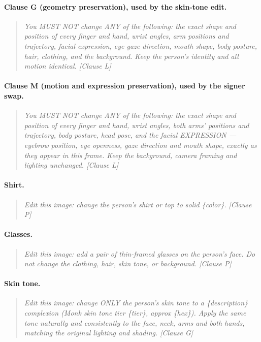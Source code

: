 \paragraph{Clause G (geometry preservation), used by the skin-tone edit.}
\begin{quote}\small\itshape
You MUST NOT change ANY of the following: the exact shape and position of
every finger and hand, wrist angles, arm positions and trajectory, facial
expression, eye gaze direction, mouth shape, body posture, hair, clothing,
and the background. Keep the person's identity and all motion identical.
[Clause L]
\end{quote}

\paragraph{Clause M (motion and expression preservation), used by the signer swap.}
\begin{quote}\small\itshape
You MUST NOT change ANY of the following: the exact shape and position of
every finger and hand, wrist angles, both arms' positions and trajectory,
body posture, head pose, and the facial EXPRESSION --- eyebrow position,
eye openness, gaze direction and mouth shape, exactly as they appear in
this frame. Keep the background, camera framing and lighting unchanged.
[Clause L]
\end{quote}

\paragraph{Shirt.}
\begin{quote}\small\itshape
Edit this image: change the person's shirt or top to solid \{color\}.
[Clause P]
\end{quote}

\paragraph{Glasses.}
\begin{quote}\small\itshape
Edit this image: add a pair of thin-framed glasses on the person's face.
Do not change the clothing, hair, skin tone, or background. [Clause P]
\end{quote}

\paragraph{Skin tone.}
\begin{quote}\small\itshape
Edit this image: change ONLY the person's skin tone to a \{description\}
complexion (Monk skin tone tier \{tier\}, approx \{hex\}). Apply the same
tone naturally and consistently to the face, neck, arms and both hands,
matching the original lighting and shading. [Clause G]
\end{quote}

